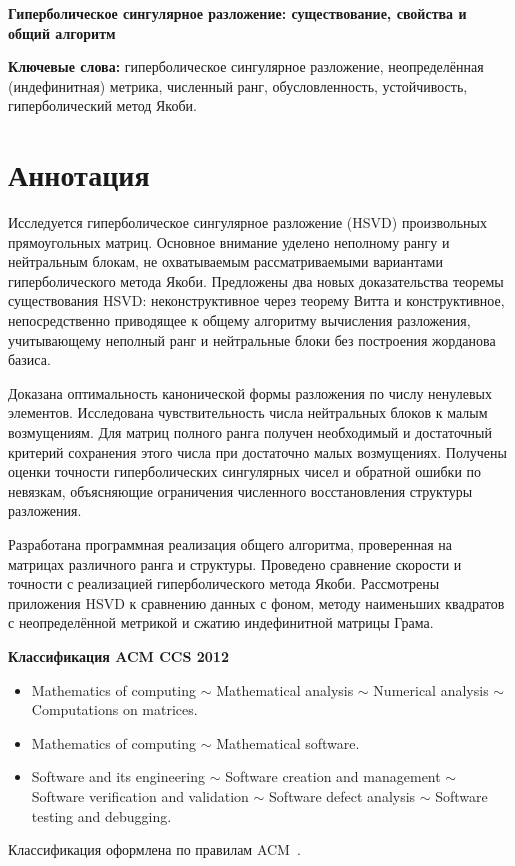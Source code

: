 \documentclass[a4paper,12pt]{article}
\theoremstyle{csstyle}
\begin{document}
\hypersetup{pageanchor=false}
\begin{titlepage}
\centering
\vspace*{4.4cm}
{\LARGE\bfseries Гиперболическое сингулярное разложение: существование, свойства и общий алгоритм\par}
\vspace{2cm}
\begin{minipage}{0.86\textwidth}
\centering
\textbf{Ключевые слова:} гиперболическое сингулярное разложение, неопределённая (индефинитная) метрика, численный ранг, обусловленность, устойчивость, гиперболический метод Якоби.
\end{minipage}
\end{titlepage}
\hypersetup{pageanchor=true}
\setcounter{page}{2}

\section*{Аннотация}
Исследуется гиперболическое сингулярное разложение (HSVD) произвольных
прямоугольных матриц.
Основное внимание уделено неполному рангу и нейтральным блокам, не охватываемым рассматриваемыми вариантами гиперболического метода Якоби.
Предложены два новых доказательства теоремы существования HSVD:
неконструктивное через теорему Витта и конструктивное, непосредственно
приводящее к общему алгоритму вычисления разложения, учитывающему неполный ранг и нейтральные блоки без построения жорданова базиса.

Доказана оптимальность канонической формы разложения по числу ненулевых элементов. Исследована чувствительность числа нейтральных блоков к малым возмущениям. Для матриц полного ранга получен необходимый и достаточный критерий сохранения этого числа при достаточно малых возмущениях.
Получены оценки точности гиперболических сингулярных чисел и обратной ошибки по невязкам, объясняющие ограничения численного восстановления структуры разложения.

Разработана программная реализация общего алгоритма, проверенная на матрицах различного ранга и структуры. Проведено сравнение скорости и точности с реализацией гиперболического метода Якоби.
Рассмотрены приложения HSVD к сравнению данных с фоном, методу наименьших квадратов с неопределённой метрикой и сжатию индефинитной матрицы Грама.


\vspace{0.5cm}
\noindent\textbf{Классификация ACM CCS 2012}\par
\begin{itemize}[leftmargin=1.4em,itemsep=5pt]
\item Mathematics of computing $\sim$ Mathematical analysis $\sim$ Numerical analysis $\sim$ Computations on matrices.
\item Mathematics of computing $\sim$ Mathematical software.
\item Software and its engineering $\sim$ Software creation and management $\sim$ Software verification and validation $\sim$ Software defect analysis $\sim$ Software testing and debugging.
\end{itemize}
Классификация оформлена по правилам ACM~\cite{ACM}.
\end{document}
